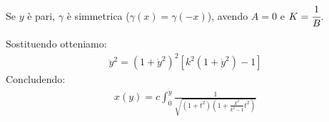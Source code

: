 Se $y$ è pari, $\gamma$ è simmetrica ($\gamma(x)=\gamma(-x)$), avendo $A=0$ e $K=\cfrac{1}{B}$.

Sostituendo otteniamo:
\begin{align*}
    \ddot{y}^2=(1+\dot{y}^2)^2[k^2(1+\dot{y}^2)-1]
\end{align*}
Concludendo:
\begin{align*}
    x(y)=c \int^{\dot{y}}_0 \frac{1}{\sqrt{(1+t^2)(1+\frac{k^2}{k^2-1}t^2)}}
\end{align*}